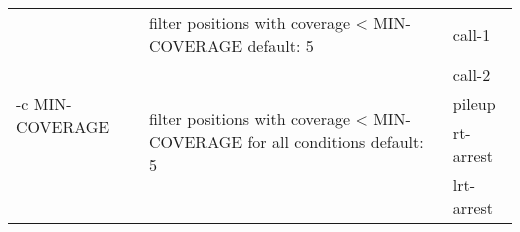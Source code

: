{\small
\begin{tabular}{@{}p{}p{}l@{}}
\multirow{5}{=}{-c MIN-COVERAGE} & filter positions with coverage < MIN-COVERAGE
default: 5 & call-1 \\
 & \multirow{4}{=}{filter positions with coverage < MIN-COVERAGE for all conditions
default: 5} & call-2 \\
 &  & pileup \\
 &  & rt-arrest \\
 &  & lrt-arrest \\
\end{tabular}\\
}
